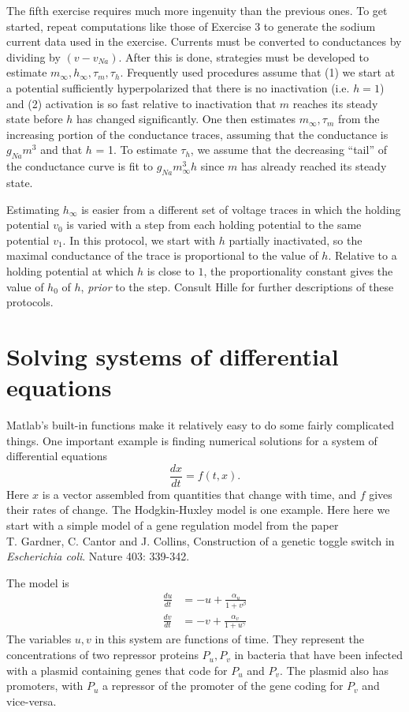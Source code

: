 \documentclass [11pt]{article}
\newcounter{exercise}
\numberwithin{exercise}{section}
\begin{document}
The fifth exercise requires much more ingenuity than the previous ones. 
To get started, repeat computations like 
those of Exercise 3 to generate the sodium current data used in the exercise.
Currents must be converted to conductances by dividing by $(v-v_{Na})$.
After this is done, strategies must be developed to estimate 
$m_\infty,h_\infty,\tau_m,\tau_h$. Frequently used procedures 
assume that (1) we start at a potential sufficiently hyperpolarized that there is
no inactivation (i.e. $h=1$) and (2) activation is so fast relative to 
inactivation that  $m$ reaches its steady state before $h$ has changed 
significantly. One then estimates $m_\infty,\tau_m$ from the increasing 
portion of the conductance traces, assuming that the conductance is 
$g_{Na}m^3$ and that $h$ = 1. To estimate $\tau_h$, we assume that the 
decreasing ``tail'' of the conductance curve is fit to $g_{Na}m_{\infty}^3h$
since $m$ has already reached its steady state. 

Estimating $h_{\infty}$ is easier from a different set of  voltage traces in
which the holding potential $v_0$ is varied with a step from each 
holding potential to the same potential $v_1$.
In this protocol, we start with $h$ partially inactivated, so the maximal 
conductance of the trace is proportional to the value of $h$. Relative to
a holding potential at which $h$ is close to $1$, the proportionality
constant gives the value of $h_0$ of $h$, {\it prior} to the step. Consult 
Hille for further descriptions of these protocols.


\section{Solving systems of differential equations} 
Matlab's built-in functions make it relatively easy to do some fairly 
complicated things. One important example is finding numerical solutions
for a system of differential equations $$\frac{dx}{dt}=f(t,x).$$ 
Here $x$ is a vector assembled from quantities that change with time,
and $f$ gives their rates of change. The Hodgkin-Huxley model is one 
example. Here here we start with a simple model of a gene regulation model
from the paper \\ 
T. Gardner, C. Cantor and J. Collins, Construction of a genetic
toggle switch in {\it Escherichia coli}. Nature 403: 339-342.

The model is 
\begin{equation}
\begin{split}
\frac{du}{dt} & =  -u + \frac{\alpha_u}{1+v^\beta} \\
\frac{dv}{dt} & =  -v + \frac{\alpha_v}{1+u^\gamma}
\end{split}
\label{ts_eqn}
\end{equation}
The variables $u,v$ in this system are functions of time. They
represent the concentrations of two repressor proteins $P_u,P_v$ in
bacteria that have been infected with a plasmid containing genes that
code for $P_u$ and $P_v$. The plasmid also has promoters, with $P_u$ a
repressor of the promoter of the gene coding for $P_v$ and vice-versa.
\end{document}
